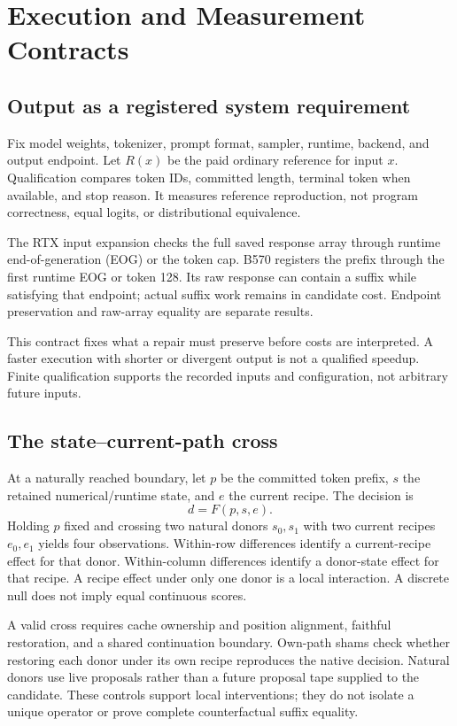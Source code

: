 \section{Execution and Measurement Contracts}
\label{sec:contracts}
\subsection{Output as a registered system requirement}
Fix model weights, tokenizer, prompt format, sampler, runtime, backend, and output endpoint. Let $R(x)$ be the paid ordinary reference for input $x$. Qualification compares token IDs, committed length, terminal token when available, and stop reason. It measures reference reproduction, not program correctness, equal logits, or distributional equivalence.

The RTX input expansion checks the full saved response array through runtime end-of-generation (EOG) or the token cap. B570 registers the prefix through the first runtime EOG or token 128. Its raw response can contain a suffix while satisfying that endpoint; actual suffix work remains in candidate cost. Endpoint preservation and raw-array equality are separate results.

This contract fixes what a repair must preserve before costs are interpreted. A faster execution with shorter or divergent output is not a qualified speedup. Finite qualification supports the recorded inputs and configuration, not arbitrary future inputs.

\subsection{The state--current-path cross}
At a naturally reached boundary, let $p$ be the committed token prefix, $s$ the retained numerical/runtime state, and $e$ the current recipe. The decision is
\begin{equation}
d=F(p,s,e).
\end{equation}
Holding $p$ fixed and crossing two natural donors $s_0,s_1$ with two current recipes $e_0,e_1$ yields four observations. Within-row differences identify a current-recipe effect for that donor. Within-column differences identify a donor-state effect for that recipe. A recipe effect under only one donor is a local interaction. A discrete null does not imply equal continuous scores.

A valid cross requires cache ownership and position alignment, faithful restoration, and a shared continuation boundary. Own-path shams check whether restoring each donor under its own recipe reproduces the native decision. Natural donors use live proposals rather than a future proposal tape supplied to the candidate. These controls support local interventions; they do not isolate a unique operator or prove complete counterfactual suffix equality.

